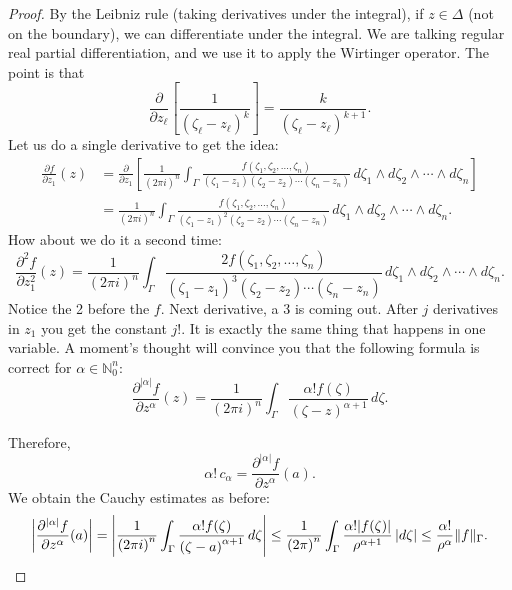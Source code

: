 \documentclass[12pt,openany]{book}
\newcommand{\sabs}[1]{\lvert {#1} \rvert}
\newcommand{\snorm}[1]{\lVert {#1} \rVert}
\newcommand{\abs}[1]{\left\lvert {#1} \right\rvert}
\newcommand{\N}{{\mathbb{N}}}
\theoremstyle{plain}
\theoremstyle{remark}
\theoremstyle{definition}
\theoremstyle{exercise}
\theoremstyle{example}
\begin{document}
\begin{proof}
By the Leibniz rule (taking derivatives under the integral),
if $z \in \Delta$ (not on the boundary),
we can differentiate under the integral.  We are talking regular real
partial differentiation, and we use it to apply the Wirtinger operator.
The point is that
\begin{equation*}
\frac{\partial}{\partial z_\ell} \left[
\frac{1}{{(\zeta_\ell-z_\ell)}^k} \right]
=
\frac{k}{{(\zeta_\ell-z_\ell)}^{k+1}} .
\end{equation*}
Let us do a single derivative to
get the idea:
\begin{equation*}
\begin{split}
\frac{\partial f}{\partial z_1}(z) &=
\frac{\partial}{\partial z_1} \left[
\frac{1}{{(2\pi i)}^n}
\int_{\Gamma}
\frac{f(\zeta_1,\zeta_2,\ldots,\zeta_n)}{(\zeta_1-z_1)(\zeta_2-z_2)\cdots(\zeta_n-z_n)}
\,
d \zeta_1 
\wedge
d \zeta_2
\wedge
\cdots
\wedge
d \zeta_n 
\right]
\\
& =
\frac{1}{{(2\pi i)}^n}
\int_{\Gamma}
\frac{f(\zeta_1,\zeta_2,\ldots,\zeta_n)}{{(\zeta_1-z_1)}^2(\zeta_2-z_2)\cdots(\zeta_n-z_n)}
\,
d \zeta_1 
\wedge
d \zeta_2
\wedge
\cdots
\wedge
d \zeta_n .
\end{split}
\end{equation*}
How about we do it a second time:
\begin{equation*}
\frac{\partial^2 f}{\partial z_1^2}(z) 
=
\frac{1}{{(2\pi i)}^n}
\int_{\Gamma}
\frac{2 f(\zeta_1,\zeta_2,\ldots,\zeta_n)}{{(\zeta_1-z_1)}^3(\zeta_2-z_2)\cdots(\zeta_n-z_n)}
\,
d \zeta_1 
\wedge
d \zeta_2
\wedge
\cdots
\wedge
d \zeta_n .
\end{equation*}
Notice the 2 before the $f$.  Next derivative, a 3 is coming out.  After $j$
derivatives in $z_1$ you get the constant $j!$.
It is exactly the same thing that happens in one variable.  A moment's
thought will convince you that the following formula is correct for
$\alpha \in \N_0^n$:
\begin{equation*}
\frac{\partial^{\sabs{\alpha}}f}{\partial z^\alpha} (z) =
\frac{1}{{(2\pi i)}^n}
\int_{\Gamma}
\frac{\alpha! f(\zeta)}{{(\zeta-z)}^{\alpha+1}}
\,
d \zeta .
\end{equation*}

Therefore,
\begin{equation*}
\alpha! \, c_\alpha = 
\frac{\partial^{\sabs{\alpha}} f}{\partial z^\alpha} (a) .
\end{equation*}
We obtain the Cauchy estimates as before:
\begin{equation*}
\abs{\frac{\partial^{\sabs{\alpha}}f}{\partial z^\alpha}(a)}
=
\abs{
\frac{1}{{(2\pi i)}^n}
\int_{\Gamma}
\frac{\alpha! f(\zeta)}{{(\zeta-a)}^{\alpha+1}}
\,
d \zeta }
\leq
\frac{1}{{(2\pi)}^n}
\int_{\Gamma}
\frac{\alpha! \sabs{f(\zeta)}}{\rho^{\alpha+1}}
\,
\sabs{d \zeta}
\leq
\frac{\alpha!}{\rho^\alpha}
\snorm{f}_\Gamma . \qedhere
\end{equation*}
\end{proof}
\end{document}
